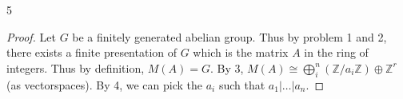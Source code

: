\documentclass{article}
\newcommand{\Z}{\mathbb{Z}}
\begin{document}
\bigskip

\begin{PROB}{5}\label{Problem 5.}
\end{PROB}
\begin{proof}
    Let $G$ be a finitely generated abelian group. Thus by problem 1 and 2, there exists a finite presentation of $G$ which is the matrix $A$ in the ring of integers. Thus by definition, $M(A) = G$. By 3, $M(A) \cong \bigoplus_{i}^n \left(\Z / a_i\Z\right) \oplus \Z^r$ (as vectorspaces). By 4, we can pick the $a_i$ such that $a_1 | \dots | a_n$.  
\end{proof}

\bigskip
\end{document}
